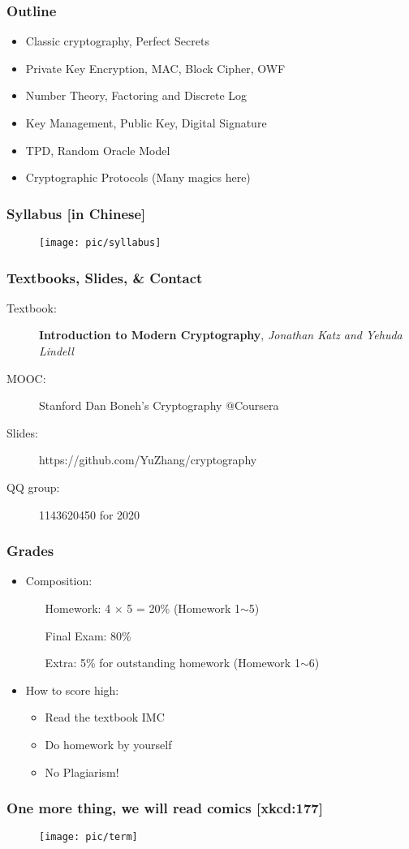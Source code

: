 \begin{frame}\frametitle{Outline}
\begin{itemize}
\item Classic cryptography, Perfect Secrets
\item Private Key Encryption, MAC, Block Cipher, OWF
\item Number Theory, Factoring and Discrete Log
\item Key Management, Public Key, Digital Signature
\item TPD, Random Oracle Model
\item Cryptographic Protocols (Many magics here)
\end{itemize}
\end{frame}
\begin{frame}\frametitle{Syllabus [in Chinese]}
\begin{figure}
\begin{center}
\texttt{[image: pic/syllabus]} 
\end{center}
\end{figure}
\end{frame}
\begin{frame}\frametitle{Textbooks, Slides, \& Contact}
\begin{description} 
\item[Textbook:] \textbf{Introduction to Modern Cryptography}, \emph{Jonathan Katz and Yehuda Lindell} %
\item[MOOC:] Stanford Dan Boneh's Cryptography @Coursera
\item[Slides:] https://github.com/YuZhang/cryptography
\item[QQ group:] 1143620450 for 2020
\end{description}
\end{frame}
\begin{frame}\frametitle{Grades}
\begin{itemize}
\item Composition:
\begin{itemize}
\item[Homework:] 4 $\times$ 5 = 20\% (Homework 1$\sim$5)
\item[Final Exam:] 80\%
\item[Extra:]  5\% for outstanding homework (Homework 1$\sim$6)
\end{itemize}
\item How to score high:
\begin{itemize}
\item Read the textbook IMC
\item Do homework by yourself
\item \alert{No Plagiarism!} 
\end{itemize}
\end{itemize}
\end{frame}
\begin{frame}\frametitle{One more thing, we will read comics  [xkcd:177]}
\begin{figure}
\begin{center}
\texttt{[image: pic/term]} 
\end{center}
\end{figure}
\end{frame}
